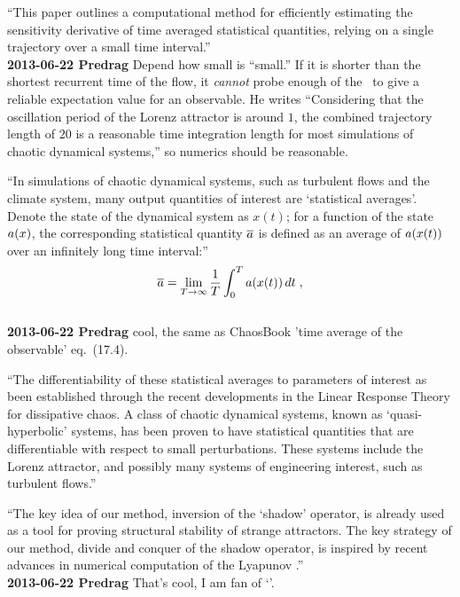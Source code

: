 \begin{description}
``This paper outlines a computational method for efficiently
estimating the sensitivity derivative of time averaged statistical
quantities, relying on a single trajectory over a small time interval.''
\\
{\bf 2013-06-22 Predrag} Depend how small is ``small.'' If it is
shorter than the shortest recurrent time of the flow, it
\emph{cannot} probe enough of the \statesp\ to give a reliable
expectation value for an observable. He writes ``Considering that the
oscillation period of the Lorenz attractor is around $1$, the
combined trajectory length of $20$ is a reasonable time integration
length for most simulations of chaotic dynamical systems,'' so
numerics should be reasonable.

``In simulations of chaotic dynamical systems, such as turbulent flows and
the climate system, many output quantities of interest are
                                \toCB
`statistical
averages'.  Denote the state of the dynamical system as $x(t)$;
for a function of the state $a(x)$,
the corresponding statistical quantity $\overline{a}$ is defined
as an average of $a(x(t))$ over an infinitely long time interval:''
\begin{equation} \label{Wang13:stats}
\overline{a} = \lim_{T\rightarrow\infty}
\frac1T \int_0^T a(x(t))\,dt\;,
\end{equation}
\\
{\bf 2013-06-22 Predrag} cool, the same as ChaosBook 'time average of
the observable' eq.~(17.4).

``The differentiability of these statistical averages to parameters
of interest as been established through the recent developments in
the Linear Response Theory for dissipative
chaos. A class of chaotic dynamical systems,
known as `quasi-hyperbolic' systems, has been proven to have
statistical quantities that are differentiable with respect to small
perturbations.  These systems include the Lorenz attractor, and
possibly many systems of engineering interest, such as turbulent
flows.''

``The key idea of our method, inversion of the `shadow' operator, is
already used as a tool for proving structural stability of strange
attractors. The key strategy of our method, divide and
conquer of the shadow operator, is inspired by recent advances in
numerical computation of the Lyapunov {\cLvs}.''
\\
{\bf 2013-06-22 Predrag} That's cool, I am fan of `{\cLvs}'.


\end{description}

